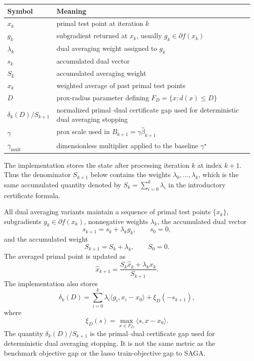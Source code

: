 \documentclass[11pt]{article}
\begin{document}
\begin{center}
\small
\begin{tabular}{ll}
\toprule
Symbol & Meaning \\
\midrule
\(x_k\) & primal test point at iteration \(k\) \\
\(g_k\) & subgradient returned at \(x_k\), usually \(g_k\in\partial f(x_k)\) \\
\(\lambda_k\) & dual averaging weight assigned to \(g_k\) \\
\(s_k\) & accumulated dual vector \\
\(S_k\) & accumulated averaging weight \\
\(\hat x_k\) & weighted average of past primal test points \\
\(D\) & prox-radius parameter defining \(F_D=\{x:d(x)\le D\}\) \\
\(\delta_k(D)/S_{k+1}\) & normalized primal--dual certificate gap used for deterministic dual averaging stopping \\
\(\gamma\) & prox scale used in \(B_{k+1}=\gamma\hat\beta_{k+1}\) \\
\(\gamma_{\mathrm{mult}}\) & dimensionless multiplier applied to the baseline \(\gamma^\star\) \\
\bottomrule
\end{tabular}
\end{center}

The implementation stores the state after processing iteration \(k\) at index
\(k+1\).  Thus the denominator \(S_{k+1}\) below contains the weights
\(\lambda_0,\ldots,\lambda_k\), which is the same accumulated quantity denoted
by \(S_k=\sum_{i=0}^k\lambda_i\) in the introductory certificate formula.

All dual averaging variants maintain a sequence of primal test points
\(\{x_k\}\), subgradients \(g_k\in\partial f(x_k)\), nonnegative weights
\(\lambda_k\), the accumulated dual vector
\[
    s_{k+1}=s_k+\lambda_k g_k,\qquad s_0=0,
\]
and the accumulated weight
\[
    S_{k+1}=S_k+\lambda_k,\qquad S_0=0.
\]
The averaged primal point is updated as
\[
    \hat x_{k+1}
    =
    \frac{S_k\hat x_k+\lambda_k x_k}{S_{k+1}}.
\]
The implementation also stores
\[
    \delta_k(D)
    =
    \sum_{i=0}^k\lambda_i\langle g_i,x_i-x_0\rangle
    +\xi_D(-s_{k+1}),
\]
where
\[
    \xi_D(s)=\max_{x\in F_D}\langle s,x-x_0\rangle .
\]
The quantity \(\delta_k(D)/S_{k+1}\) is the primal--dual certificate gap used
for deterministic dual averaging stopping.  It is not the same metric as the
benchmark objective gap or the lasso train-objective gap to SAGA.
\end{document}
